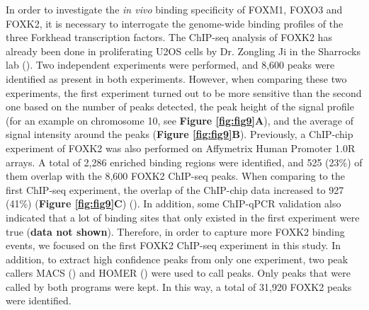 In order to investigate the \textit{in vivo} binding specificity of FOXM1, FOXO3 and FOXK2, it is necessary to interrogate the genome-wide binding profiles of the three Forkhead transcription factors. The ChIP-seq analysis of FOXK2 has already been done in proliferating U2OS cells by Dr. Zongling Ji in the Sharrocks lab (\cite{ji2012the}). Two independent experiments were performed, and 8,600 peaks were identified as present in both experiments. However, when comparing these two experiments, the first experiment turned out to be more sensitive than the second one based on the number of peaks detected, the peak height of the signal profile (for an example on chromosome 10, see \textbf{Figure \ref{fig:fig9}A}), and the average of signal intensity around the peaks (\textbf{Figure \ref{fig:fig9}B}). Previously, a ChIP-chip experiment of FOXK2 was also performed on Affymetrix Human Promoter 1.0R arrays. A total of 2,286 enriched binding regions were identified, and 525 (23\%) of them overlap with the 8,600 FOXK2 ChIP-seq peaks. When comparing to the first ChIP-seq experiment, the overlap of the ChIP-chip data increased to 927 (41\%) (\textbf{Figure \ref{fig:fig9}C}) (\cite{ji2012the}). In addition, some ChIP-qPCR validation also indicated that a lot of binding sites that only existed in the first experiment were true (\textbf{data not shown}). Therefore, in order to capture more FOXK2 binding events, we focused on the first FOXK2 ChIP-seq experiment in this study. In addition, to extract high confidence peaks from only one experiment, two peak callers MACS (\cite{zhang2008model-based}) and HOMER (\cite{heinz2010simple}) were used to call peaks. Only peaks that were called by both programs were kept. In this way, a total of 31,920 FOXK2 peaks were identified.

